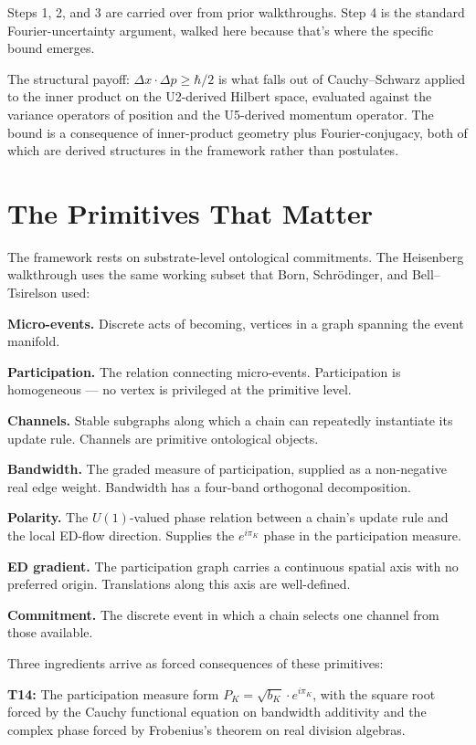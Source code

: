 \documentclass[11pt,a4paper]{article}
\begin{document}
Steps 1, 2, and 3 are carried over from prior walkthroughs. Step 4 is the standard Fourier-uncertainty argument, walked here because that's where the specific bound emerges.

The structural payoff: $\Delta x \cdot \Delta p \geq \hbar/2$ is what falls out of Cauchy--Schwarz applied to the inner product on the U2-derived Hilbert space, evaluated against the variance operators of position and the U5-derived momentum operator. The bound is a consequence of inner-product geometry plus Fourier-conjugacy, both of which are derived structures in the framework rather than postulates.

\section{The Primitives That Matter}

The framework rests on substrate-level ontological commitments. The Heisenberg walkthrough uses the same working subset that Born, Schr\"odinger, and Bell--Tsirelson used:

\textbf{Micro-events.} Discrete acts of becoming, vertices in a graph spanning the event manifold.

\textbf{Participation.} The relation connecting micro-events. Participation is homogeneous --- no vertex is privileged at the primitive level.

\textbf{Channels.} Stable subgraphs along which a chain can repeatedly instantiate its update rule. Channels are primitive ontological objects.

\textbf{Bandwidth.} The graded measure of participation, supplied as a non-negative real edge weight. Bandwidth has a four-band orthogonal decomposition.

\textbf{Polarity.} The $U(1)$-valued phase relation between a chain's update rule and the local ED-flow direction. Supplies the $e^{i\pi_K}$ phase in the participation measure.

\textbf{ED gradient.} The participation graph carries a continuous spatial axis with no preferred origin. Translations along this axis are well-defined.

\textbf{Commitment.} The discrete event in which a chain selects one channel from those available.

Three ingredients arrive as forced consequences of these primitives:

\textbf{T14:} The participation measure form $P_K = \sqrt{b_K}\cdot e^{i\pi_K}$, with the square root forced by the Cauchy functional equation on bandwidth additivity and the complex phase forced by Frobenius's theorem on real division algebras.
\end{document}
